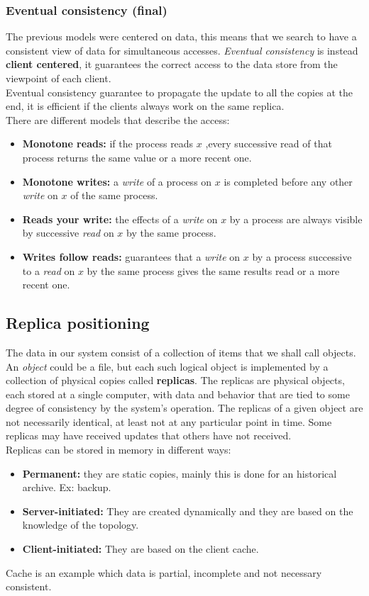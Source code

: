 \subsubsection{Eventual consistency (final)}
The previous models were centered on data, this means that we search to have a consistent view of data for simultaneous accesses. \textit{Eventual consistency} is instead \textbf{client centered}, it guarantees the correct access to the data store from the viewpoint of each client.\\
Eventual consistency guarantee to propagate the update to all the copies at the end, it is efficient if the clients always work on the same replica.\\
There are different models that describe the access:
\begin{itemize}
	\item \textbf{Monotone reads:} if the process reads $x$ ,every successive read of
	that process returns the same value or a more recent one.
	\item \textbf{Monotone writes:} a \textit{write} of a process on $x$ is completed before any other \textit{write} on $x$ of the same process.
	\item \textbf{Reads your write: }the effects of a \textit{write} on $x$ by a process are always
	visible by successive \textit{read} on $x$ by the same process.
	\item \textbf{Writes follow reads:} guarantees that a \textit{write} on $x$ by a process successive to a \textit{read} on $x$ by the same process gives the same results read or a more recent one.
\end{itemize}

\subsection{Replica positioning}
The data in our system consist of a collection of items that we shall call objects. An
\textit{object} could be a file, but each such logical object is implemented by a collection of physical copies called \textbf{replicas}. The replicas are physical objects, each stored at a single computer, with data and behavior that are tied to some degree of consistency by the system’s operation. The replicas of a given object are not
necessarily identical, at least not at any particular point in time. Some replicas may have received updates that others have not received.\\
Replicas can be stored in memory in different ways:
\begin{itemize}
	\item \textbf{Permanent: }they are static copies, mainly this is done for an historical archive. Ex: backup.
	\item \textbf{Server-initiated: }They are created dynamically and they are based on the knowledge of the topology.
	\item \textbf{Client-initiated: }They are based on the client cache.
\end{itemize}
Cache is an example which data is partial, incomplete and not necessary consistent.
 
